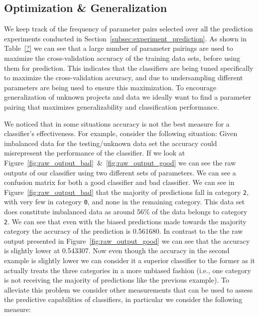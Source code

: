 \subsection{Optimization \& Generalization}
\label{subsec:experiment_optimization_generalization}
We keep track of the frequency of parameter pairs selected over all the prediction experiments conducted in Section~\ref{subsec:experiment_prediction}. As shown in Table~\ref{?} we can see that a large number of parameter pairings are used to maximize the cross-validation accuracy of the training data sets, before using them for prediction. This indicates that the classifiers are being tuned specifically to maximize the cross-validation accuracy, and due to undersampling different parameters are being used to ensure this maximization. To encourage generalization of unknown projects and data we ideally want to find a parameter pairing that maximizes generalizability and classification performance.

We noticed that in some situations accuracy is not the best measure for a classifier's effectiveness. For example, consider the following situation: Given imbalanced data for the testing/unknown data set the accuracy could misrepresent the performance of the classifier. If we look at Figure~\ref{fig:raw_output_bad}~\&~\ref{fig:raw_output_good} we can see the raw outputs of our classifier using two different sets of parameters. We can see a confusion matrix for both a good classifier and bad classifier. We can see in Figure~\ref{fig:raw_output_bad} that the majority of predictions fall in category \texttt{2}, with very few in category \texttt{0}, and none in the remaining category. This data set does constitute imbalanced data as around 56\% of the data belongs to category \texttt{2}. We can see that even with the biased predictions made towards the majority category the accuracy of the prediction is 0.561680. In contrast to the the raw output presented in Figure~\ref{fig:raw_output_good} we can see that the accuracy is slightly lower at 0.543307. Now even though the accuracy in the second example is slightly lower we can consider it a superior classifier to the former as it actually treats the three categories in a more unbiased fashion (i.e., one category is not receiving the majority of predictions like the previous example). To alleviate this problem we consider other measurements that can be used to assess the predictive capabilities of classifiers, in particular we consider the following measure:

